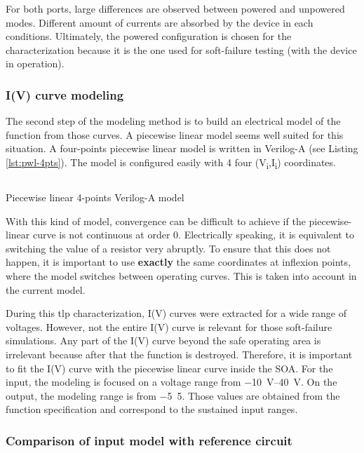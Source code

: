 For both ports, large differences are observed between powered and unpowered modes.
Different amount of currents are absorbed by the device in each conditions.
Ultimately, the powered configuration is chosen for the characterization because it is the one used for soft-failure testing (with the device in operation).

\subsubsection{I(V) curve modeling}

The second step of the modeling method is to build an electrical model of the function from those curves.
A piecewise linear model seems well suited for this situation.
A four-points piecewise linear model is written in Verilog-A (see Listing \ref{lst:pwl-4pts}).
The model is configured easily with 4 four (V\textsubscript{i},I\textsubscript{i}) coordinates.

\begin{code}
\inputminted[frame=single]{verilog}{src/4/snippets/pwl_4pts.va}
\caption{Piecewise linear 4-points Verilog-A model}
\label{lst:pwl-4pts}
\end{code}

With this kind of model, convergence can be difficult to achieve if the piecewise-linear curve is not continuous at order 0.
Electrically speaking, it is equivalent to switching the value of a resistor very abruptly.
To ensure that this does not happen, it is important to use \textbf{exactly} the same coordinates at inflexion points, where the model switches between operating curves.
This is taken into account in the current model.

During this \gls{tlp} characterization, I(V) curves were extracted for a wide range of voltages.
However, not the entire I(V) curve is relevant for those soft-failure simulations.
Any part of the I(V) curve beyond the safe operating area is irrelevant because after that the function is destroyed.
Therefore, it is important to fit the I(V) curve with the piecewise linear curve inside the SOA.
For the input, the modeling is focused on a voltage range from \SIrange{-10}{40}{\volt}.
On the output, the modeling range is from \SI{-5}{5}{\volt}.
Those values are obtained from the function specification and correspond to the sustained input ranges.

\subsubsection{Comparison of input model with reference circuit}

